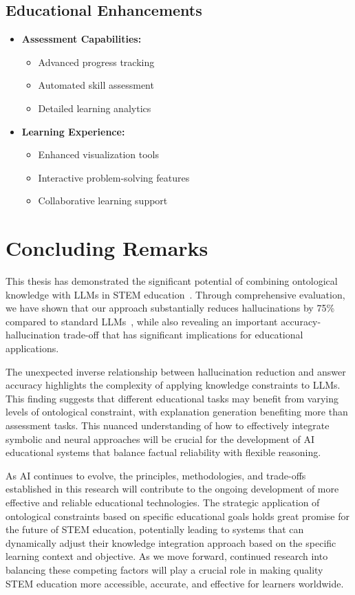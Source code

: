 \subsection{Educational Enhancements}
\begin{itemize}
    \item \textbf{Assessment Capabilities:}
        \begin{itemize}
            \item Advanced progress tracking
            \item Automated skill assessment
            \item Detailed learning analytics
        \end{itemize}
    
    \item \textbf{Learning Experience:}
        \begin{itemize}
            \item Enhanced visualization tools
            \item Interactive problem-solving features
            \item Collaborative learning support
        \end{itemize}
\end{itemize}

\section{Concluding Remarks}
\label{sec:concluding-remarks}

This thesis has demonstrated the significant potential of combining ontological knowledge with LLMs in STEM education~\cite{mendel2024hypercubes}. Through comprehensive evaluation, we have shown that our approach substantially reduces hallucinations by 75\% compared to standard LLMs~\cite{rivera2024impact}, while also revealing an important accuracy-hallucination trade-off that has significant implications for educational applications.

The unexpected inverse relationship between hallucination reduction and answer accuracy highlights the complexity of applying knowledge constraints to LLMs. This finding suggests that different educational tasks may benefit from varying levels of ontological constraint, with explanation generation benefiting more than assessment tasks. This nuanced understanding of how to effectively integrate symbolic and neural approaches will be crucial for the development of AI educational systems that balance factual reliability with flexible reasoning.

As AI continues to evolve, the principles, methodologies, and trade-offs established in this research will contribute to the ongoing development of more effective and reliable educational technologies. The strategic application of ontological constraints based on specific educational goals holds great promise for the future of STEM education, potentially leading to systems that can dynamically adjust their knowledge integration approach based on the specific learning context and objective. As we move forward, continued research into balancing these competing factors will play a crucial role in making quality STEM education more accessible, accurate, and effective for learners worldwide.
